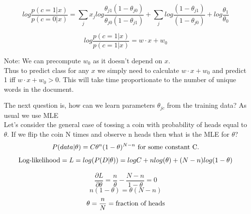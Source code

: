  \begin{equation}
 log\frac{p(c=1|x)}{p(c=0|x)} = \sum\limits_{j}x_{j}log\frac{\theta_{j1}(1-\theta_{j0})}{\theta_{j0}(1-\theta_{j1})} +
 \sum\limits_{j} log\frac{(1-\theta_{j1})}{(1-\theta_{j0})} + log \frac{\theta_{1}}{\theta_{0}}
 \end{equation}
 
  \begin{equation}
  log\frac{p(c=1|x)}{p(c=1|x)} = w \cdot x +w _{0}
  \end{equation} 
 
 Note: We can precompute $w_{0}$ as it doesn't depend on $x$. \\
 Thus to predict class for any $x$ we simply need to calculate $w \cdot x +w _{0}$ and predict 1 iff $w \cdot x +w _{0} > 0$. This will take time proportionate to the number of unique words in the document.
 
 The next question is, how can we learn parameters $\theta_{jc}$ from the training data? As usual we use MLE\\
 Let's consider the general case of tossing a coin with probability of heads equal to $\theta$. If we flip the coin N times and observe n heads then what is the MLE for $\theta$?\\
   \begin{equation}
 P(data|\theta)=C\theta^{n}(1-\theta)^{N-n}  \textnormal{ for some constant C.}
  \end{equation}
  \begin{equation}
 \textnormal{Log-likelihood}=L=log(P(D|\theta))=logC + nlog(\theta) + (N-n)log(1-\theta)
  \end{equation}
  
  
 \begin{equation}
 \frac{\partial L}{\partial \theta}=\frac{n}{\theta} - \frac{N-n}{1-\theta}=0
 \end{equation}
  \begin{equation}
n(1-\theta)=\theta(N-n)
  \end{equation}
  \begin{equation}
  \theta=\frac{n}{N}=\textnormal{fraction of heads}
  \end{equation}
  
